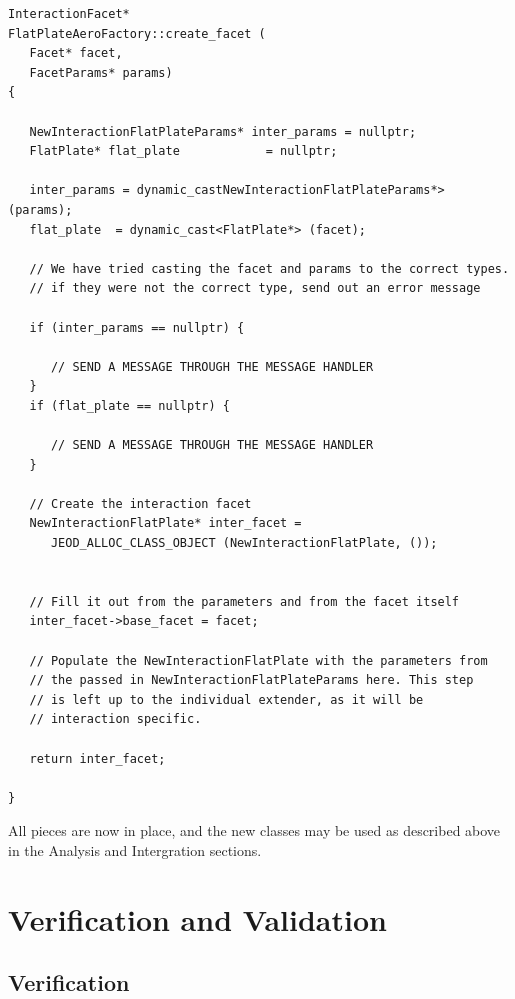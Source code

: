 \begin{verbatim}
InteractionFacet*
FlatPlateAeroFactory::create_facet (
   Facet* facet,
   FacetParams* params)
{

   NewInteractionFlatPlateParams* inter_params = nullptr;
   FlatPlate* flat_plate            = nullptr;

   inter_params = dynamic_castNewInteractionFlatPlateParams*> (params);
   flat_plate  = dynamic_cast<FlatPlate*> (facet);

   // We have tried casting the facet and params to the correct types.
   // if they were not the correct type, send out an error message

   if (inter_params == nullptr) {

      // SEND A MESSAGE THROUGH THE MESSAGE HANDLER
   }
   if (flat_plate == nullptr) {

      // SEND A MESSAGE THROUGH THE MESSAGE HANDLER
   }

   // Create the interaction facet
   NewInteractionFlatPlate* inter_facet =
      JEOD_ALLOC_CLASS_OBJECT (NewInteractionFlatPlate, ());


   // Fill it out from the parameters and from the facet itself
   inter_facet->base_facet = facet;

   // Populate the NewInteractionFlatPlate with the parameters from
   // the passed in NewInteractionFlatPlateParams here. This step
   // is left up to the individual extender, as it will be
   // interaction specific.

   return inter_facet;

}
\end{verbatim}

All pieces are now in place, and the new classes may be used
as described above in the Analysis and Intergration sections.



\chapter{Verification and Validation}\label{ch:ivv}



\section{Verification}

